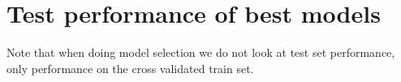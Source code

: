 \section{Test performance of best models}
Note that when doing model selection we do not look at test set performance, only 
performance on the cross validated train set.
%    
\begin{comment}
\begin{figure}
    \texttt{[image: \{correlation\_reduction/all\_features/corr\_and\_dendrogram]}.pdf}
    \caption{The Pearson correlation matrix and the corresponding hierarchial
    cluster of the training set before removing correlated features. The process
    of creating the dendrogram is described in chapter \ref{Feature selection}. 
    For readability's sake we cannot include every label in the correlation matrix.}
    \label{corr_matrix_full}
\end{figure}

\begin{figure}
    \texttt{[image: reduced\_matrix.pdf]}
    \caption{Correlation matrix after backward selection}
    \label{corr_matrix_reduced}
\end{figure}

\begin{figure}
    \texttt{[image: \{figures/permutation/all\_features\_cv/histogram\_all]}.pdf}
\caption{The two most important (above) and least important (below) features according 
to the permutation test}
\label{Hist all}
\end{figure}



\begin{figure}
    \centering
    \texttt{[image: \{CDFs/mixed\_model\_comparisons]}.pdf}
    \caption{top kjeks}
    \label{main cdf}
\end{figure}
\end{comment}
